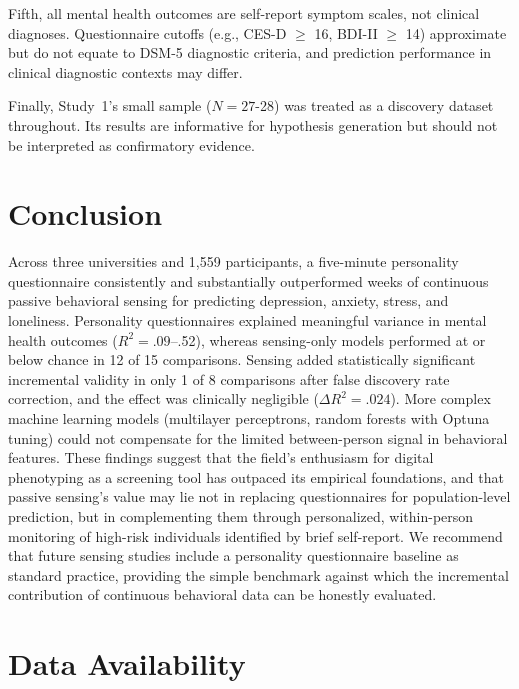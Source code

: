 \documentclass[12pt, a4paper]{article}
\begin{document}
Fifth, all mental health outcomes are self-report symptom scales, not clinical diagnoses. Questionnaire cutoffs (e.g., CES-D $\geq$ 16, BDI-II $\geq$ 14) approximate but do not equate to DSM-5 diagnostic criteria, and prediction performance in clinical diagnostic contexts may differ.

Finally, Study~1's small sample ($N = 27$-28) was treated as a discovery dataset throughout. Its results are informative for hypothesis generation but should not be interpreted as confirmatory evidence.

\section{Conclusion}

Across three universities and 1,559 participants, a five-minute personality questionnaire consistently and substantially outperformed weeks of continuous passive behavioral sensing for predicting depression, anxiety, stress, and loneliness. Personality questionnaires explained meaningful variance in mental health outcomes ($R^2 = .09$--.52), whereas sensing-only models performed at or below chance in 12 of 15 comparisons. Sensing added statistically significant incremental validity in only 1 of 8 comparisons after false discovery rate correction, and the effect was clinically negligible ($\Delta R^2 = .024$). More complex machine learning models (multilayer perceptrons, random forests with Optuna tuning) could not compensate for the limited between-person signal in behavioral features. These findings suggest that the field's enthusiasm for digital phenotyping as a screening tool has outpaced its empirical foundations, and that passive sensing's value may lie not in replacing questionnaires for population-level prediction, but in complementing them through personalized, within-person monitoring of high-risk individuals identified by brief self-report. We recommend that future sensing studies include a personality questionnaire baseline as standard practice, providing the simple benchmark against which the incremental contribution of continuous behavioral data can be honestly evaluated.


\section*{Data Availability}
\end{document}
